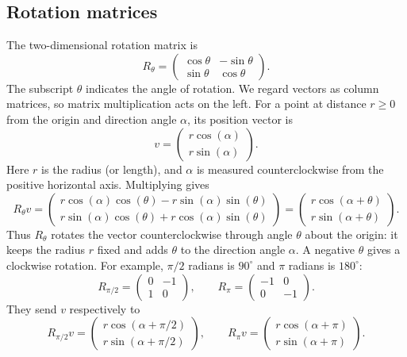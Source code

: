 \documentclass[a4paper,11pt,abstract=true]{scrartcl}
\theoremstyle{dotlessP}
\theoremstyle{dotlessS}
\theoremstyle{remark}
\theoremstyle{definition}
\begin{document}
\subsection{Rotation matrices}

The two-dimensional rotation matrix is
\[
R_{\theta}=
\begin{pmatrix}
\cos\theta&-\sin\theta\\
\sin\theta&\cos\theta
\end{pmatrix}.
\]
The subscript $\theta$ indicates the angle of rotation. We regard
vectors as column matrices, so matrix multiplication acts on the left.
For a point at distance $r\geq0$ from the origin and direction angle
$\alpha$, its position vector is
\[
v=\begin{pmatrix}
r\cos(\alpha)\\
r\sin(\alpha)
\end{pmatrix}.
\]
Here $r$ is the radius (or length), and $\alpha$ is measured
counterclockwise from the positive horizontal axis. Multiplying gives
\[
R_{\theta}v=
\begin{pmatrix}
r\cos(\alpha)\cos(\theta)-r\sin(\alpha)\sin(\theta)\\
r\sin(\alpha)\cos(\theta)+r\cos(\alpha)\sin(\theta)
\end{pmatrix}
=
\begin{pmatrix}
r\cos(\alpha+\theta)\\
r\sin(\alpha+\theta)
\end{pmatrix}.
\]
Thus $R_{\theta}$ rotates the vector counterclockwise through angle
$\theta$ about the origin: it keeps the radius $r$ fixed and adds
$\theta$ to the direction angle $\alpha$. A negative $\theta$ gives a
clockwise rotation. For example, $\pi/2$ radians is $90^\circ$ and
$\pi$ radians is $180^\circ$:
\[
R_{\pi/2}=\begin{pmatrix}0&-1\\1&0\end{pmatrix},
\qquad
R_{\pi}=\begin{pmatrix}-1&0\\0&-1\end{pmatrix}.
\]
They send $v$ respectively to
\[
R_{\pi/2}v=
\begin{pmatrix}r\cos(\alpha+\pi/2)\\r\sin(\alpha+\pi/2)\end{pmatrix},
\qquad
R_{\pi}v=
\begin{pmatrix}r\cos(\alpha+\pi)\\r\sin(\alpha+\pi)\end{pmatrix}.
\]
\end{document}

